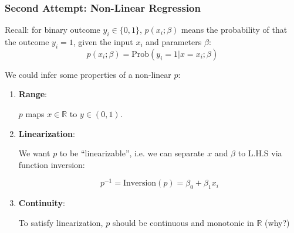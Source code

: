 \documentclass[10pt,aspectratio=169]{beamer}
\begin{document}
\begin{frame}
  \frametitle{Second Attempt: Non-Linear Regression}
  
  Recall: for binary outcome $y_{i} \in \{0, 1\}$, $p(x_{i}; \beta)$
  means the probability of that the outcome $y_{i}=1$, given the input
  $x_{i}$ and parameters $\beta$:
  \begin{equation*}
    p(x_{i}; \beta) = \mathrm{Prob}(y_{i}=1 | x=x_{i}; \beta)
  \end{equation*}

  \vspace{1em}

  We could infer some properties of a non-linear $p$:
  \begin{enumerate}
  \item \textbf{Range}:

    $p$ maps $x \in \mathbb{R}$ to $y \in (0, 1)$.
    
  \item \textbf{Linearization}:

    We want $p$ to be ``linearizable'', i.e. we can separate $x$ and
    $\beta$ to L.H.S via function inversion:

    \begin{equation*}
      p^{-1} = \mathrm{Inversion}(p) = \beta_{0} + \beta_{1} x_{i}
    \end{equation*}

  \item \textbf{Continuity}:

    To satisfy linearization, $p$ should be continuous and
    monotonic in $\mathbb{R}$ (why?)
    
  \end{enumerate}
  
\end{frame}
\end{document}
